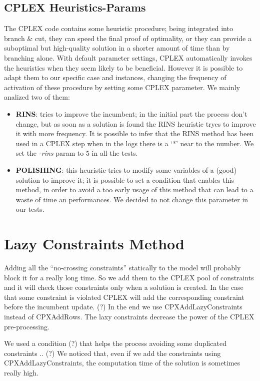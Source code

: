 \subsection{CPLEX Heuristics-Params}
The \textsc{CPLEX} code contains some heuristic procedure; being integrated into branch \& cut, they can speed the final proof of optimality, or they can provide a suboptimal but high-quality solution in a shorter amount of time than by branching alone. With default parameter settings, \textsc{CPLEX} automatically invokes the heuristics when they seem likely to be beneficial. However it is possible to adapt them to our specific case and instances, changing the frequency of activation of these procedure by setting some \textsc{CPLEX} parameter. We mainly analized two of them:
\begin{itemize}
\setlength{\parskip}{0pt}
\setlength{\itemsep}{0pt plus 1pt}
\item \textbf{RINS}: tries to improve the incumbent; in the initial part the process don’t change, but as soon as a solution is found the RINS heuristic tryes to improve it with more frequency. It is possible to infer that the RINS method has been used in a \textsc{CPLEX} step when in the logs there is a ‘*’ near to the number. We set the \textit{-rins} param to 5 in all the tests. 
\item \textbf{POLISHING}: this heuristic tries to modify some variables of a (good) solution to improve it; it is possible to set a condition that enables this method, in order to avoid a too early usage of this method that can lead to a waste of time an performances. We decided to not change this parameter in our tests.
\end{itemize}

\section{Lazy Constraints Method}
Adding all the “no-crossing constraints” statically to the model will probably block it for a really long time. So we add them to the \textsc{CPLEX} pool of constraints and it will check those constraints only when a solution is created. In the case that some constraint is violated \textsc{CPLEX} will add the corresponding constraint before the incumbent update. (?)
In the end we use CPXAddLazyConstraints instead of CPXAddRows. 
The laxy constraints decrease the power of the \textsc{CPLEX} pre-processing.

We used a condition (?) that helps the process avoiding some duplicated constraints .. (?)
We noticed that, even if we add the constraints using CPXAddLazyConstraints, the computation time of the solution is sometimes really high. 

